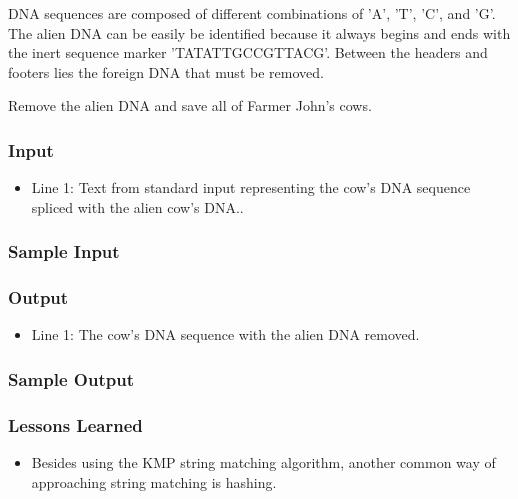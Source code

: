 DNA sequences are composed of different combinations of 'A', 'T', 'C', and 'G'.
The alien DNA can be easily be identified because it always begins and ends with the inert sequence marker \mbox{'TATATTGCCGTTACG'}.
Between the headers and footers lies the foreign DNA that must be removed.

Remove the alien DNA and save all of Farmer John's cows.

\subsubsection{Input}
\begin{itemize}
\item Line 1: Text from standard input representing the cow's DNA sequence spliced with the alien cow's DNA..
\end{itemize}

\subsubsection{Sample Input}

\subsubsection{Output}
\begin{itemize}
\item Line 1: The cow's DNA sequence with the alien DNA removed.
\end{itemize}

\subsubsection{Sample Output}

\subsubsection{Lessons Learned}
\begin{itemize}
	\item Besides using the KMP string matching algorithm, another common way of approaching string matching is hashing.
\end{itemize}

